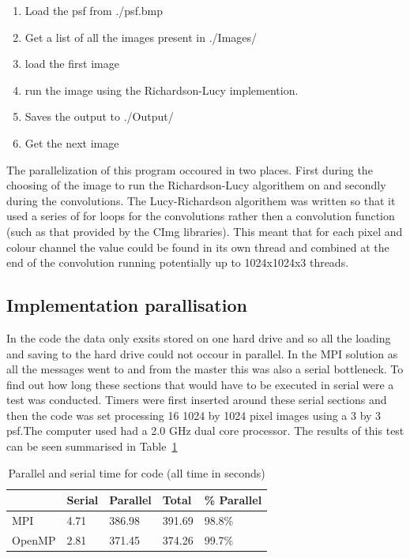 \begin{enumerate}
	\item Load the psf from ./psf.bmp
	\item Get a list of all the images present in ./Images/
	\item load the first image
	\item run the image using the Richardson-Lucy implemention.
	\item Saves the output to ./Output/
	\item Get the next image
\end{enumerate}

The parallelization of this program occoured in two places. First during the choosing of the image to run the Richardson-Lucy algorithem on and secondly during the convolutions. The Lucy-Richardson algorithem was written so that it used a series of for loops for the convolutions rather then a convolution function (such as that provided by the CImg libraries). This meant that for each pixel and colour channel the value could be found in its own thread and combined at the end of the convolution running potentially up to 1024x1024x3 threads.

\subsection{Implementation parallisation}

In the code the data only exsits stored on one hard drive and so all the loading and saving to the hard drive could not occour in parallel. In the MPI solution as all the messages went to and from the master this was also a serial bottleneck. To find out how long these sections that would have to be executed in serial were a test was conducted. Timers were first inserted around these serial sections and then the code was set processing 16 1024 by 1024 pixel images  using a 3 by 3 psf.The computer used had a 2.0 GHz dual core processor. The results of this test can be seen summarised in Table~\ref{speed}

\begin{table}[h!]
	\caption{Parallel and serial time for code (all time in seconds)}
	\begin{center}
    	\begin{tabular}{ | l | l | l | l | l |}
    	\hline
    	 & Serial & Parallel & Total & \% Parallel  \\ \hline
		MPI & 4.71 & 386.98 & 391.69 & 98.8\% \\ \hline
		OpenMP & 2.81 & 371.45 & 374.26 & 99.7\% \\ \hline
    	\end{tabular}
	\end{center}
	\label{speed}
\end{table}

